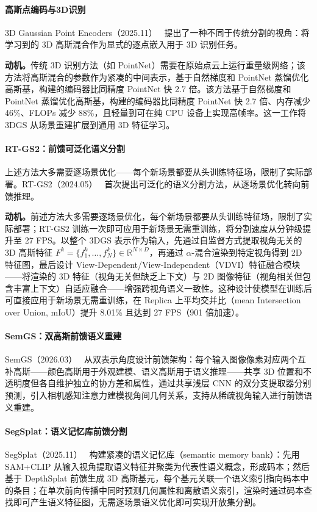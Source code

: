 \paragraph{高斯点编码与3D识别} 3D Gaussian Point Encoders（2025.11）~\cite{2511_04797} 提出了一种不同于传统分割的视角：将学习到的 3D 高斯混合作为显式的逐点嵌入用于 3D 识别任务。

\textbf{动机。}传统 3D 识别方法（如 PointNet）需要在原始点云上运行重量级网络；该方法将高斯混合的参数作为紧凑的中间表示，基于自然梯度和 PointNet 蒸馏优化高斯基，构建的编码器比同精度 PointNet 快 2.7 倍。该方法基于自然梯度和 PointNet 蒸馏优化高斯基，构建的编码器比同精度 PointNet 快 2.7 倍、内存减少 46\%、FLOPs 减少 88\%，且轻量到可在纯 CPU 设备上实现高帧率。这一工作将 3DGS 从场景重建扩展到通用 3D 特征学习。

\paragraph{RT-GS2：前馈可泛化语义分割} 上述方法大多需要逐场景优化——每个新场景都要从头训练特征场，限制了实际部署。RT-GS2（2024.05）~\cite{2405_18033} 首次提出可泛化的语义分割方法，从逐场景优化转向前馈推理。

\textbf{动机。}前述方法大多需要逐场景优化，每个新场景都要从头训练特征场，限制了实际部署；RT-GS2 训练一次即可应用于新场景无需重训练，将分割速度从分钟级提升至 27 FPS。以整个 3DGS 表示作为输入，先通过自监督方式提取视角无关的 3D 高斯特征 $F^k = \{f^k_1, \dots, f^k_N\} \in \mathbb{R}^{N \times D}$，再通过 $\alpha$-混合渲染到特定视角得到 2D 特征图，最后设计 View-Dependent/View-Independent（VDVI）特征融合模块——将渲染的 3D 特征（视角无关但缺乏上下文）与 2D 图像特征（视角相关但包含丰富上下文）自适应融合——增强跨视角语义一致性。这种设计使模型在训练后可直接应用于新场景无需重训练，在 Replica 上平均交并比（mean Intersection over Union, mIoU）提升 8.01\% 且达到 27 FPS（901 倍加速）。

\paragraph{SemGS：双高斯前馈语义重建} SemGS（2026.03）~\cite{2603_02548} 从双表示角度设计前馈架构：每个输入图像像素对应两个互补高斯——颜色高斯用于外观建模、语义高斯用于语义推理——共享 3D 位置和不透明度但各自维护独立的协方差和属性，通过共享浅层 CNN 的双分支提取器分别预测，引入相机感知注意力建模视角间几何关系，支持从稀疏视角输入进行前馈语义重建。

\paragraph{SegSplat：语义记忆库前馈分割} SegSplat（2025.11）~\cite{2511_18386} 构建紧凑的语义记忆库（semantic memory bank）：先用 SAM+CLIP 从输入视角提取语义特征并聚类为代表性语义概念，形成码本；然后基于 DepthSplat 前馈生成 3D 高斯基元，每个基元关联一个语义索引指向码本中的条目；在单次前向传播中同时预测几何属性和离散语义索引，渲染时通过码本查找即可产生语义特征图，无需逐场景语义优化即可实现开放集分割。

